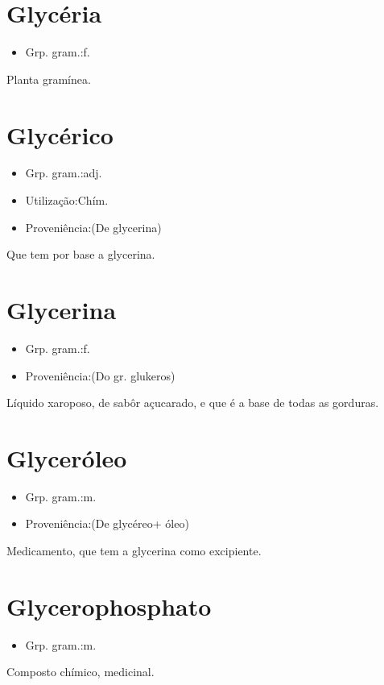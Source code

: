 \section{Glycéria}
\begin{itemize}
\item {Grp. gram.:f.}
\end{itemize}
Planta gramínea.
\section{Glycérico}
\begin{itemize}
\item {Grp. gram.:adj.}
\end{itemize}
\begin{itemize}
\item {Utilização:Chím.}
\end{itemize}
\begin{itemize}
\item {Proveniência:(De \textunderscore glycerina\textunderscore )}
\end{itemize}
Que tem por base a glycerina.
\section{Glycerina}
\begin{itemize}
\item {Grp. gram.:f.}
\end{itemize}
\begin{itemize}
\item {Proveniência:(Do gr. \textunderscore glukeros\textunderscore )}
\end{itemize}
Líquido xaroposo, de sabôr açucarado, e que é a base de todas as gorduras.
\section{Glyceróleo}
\begin{itemize}
\item {Grp. gram.:m.}
\end{itemize}
\begin{itemize}
\item {Proveniência:(De \textunderscore glycéreo\textunderscore  + \textunderscore óleo\textunderscore )}
\end{itemize}
Medicamento, que tem a glycerina como excipiente.
\section{Glycerophosphato}
\begin{itemize}
\item {Grp. gram.:m.}
\end{itemize}
Composto chímico, medicinal.
